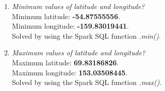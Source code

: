 \documentclass{article}
\begin{document}
\begin{enumerate}[label=\alph*)]
    \item \textit{Minimum values of latitude and longitude?}\\
    
    Minimum latitude: \textbf{-54.87555556}.\\
    Minimum longitude: \textbf{-159.83019441}.\\
    
    Solved by using the Spark SQL function \textit{.min()}.\\
    
    \item \textit{Maximum values of latitude and longitude?}\\
    
    Maximum latitude: \textbf{69.83186826}.\\
    Maximum longitude: \textbf{153.03508445}.\\
    
    Solved by using the Spark SQL function \textit{.max()}.\\
\end{enumerate}
\end{document}
